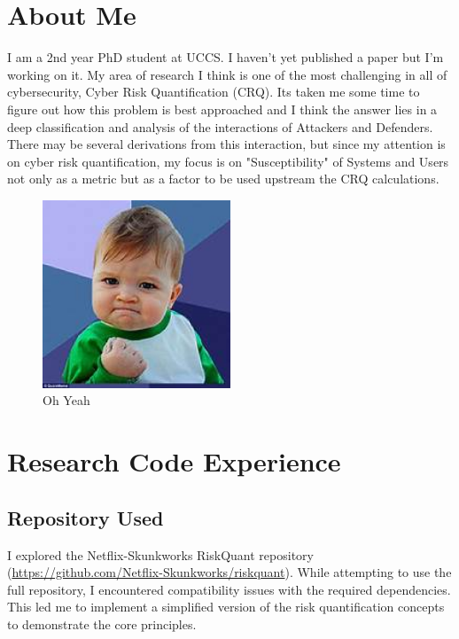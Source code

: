 
% 


\section{About Me}
I am a 2nd year PhD student at UCCS.  I haven't yet published a paper but I'm working on it.  My area of research I think is one of the most challenging in all of cybersecurity, Cyber Risk Quantification (CRQ).  Its taken me some time to figure out how this problem is best approached and I think the answer lies in a deep classification and analysis of the interactions of Attackers and Defenders. There may be several derivations from this interaction, but since my attention is on cyber risk quantification, my focus is on "Susceptibility" of Systems and Users not only as a metric but as a factor to be used upstream the CRQ calculations.
\begin{figure}[h]
    \centering
    \includegraphics[width=0.5\textwidth]{images/Oh_Yeah.jpg}
    \caption{Oh Yeah}
    \label{fig:oh-yeah}
\end{figure}

\section{Research Code Experience}
\subsection{Repository Used}
I explored the Netflix-Skunkworks RiskQuant repository 
(\url{https://github.com/Netflix-Skunkworks/riskquant}). While attempting to use 
the full repository, I encountered compatibility issues with the required dependencies. 
This led me to implement a simplified version of the risk quantification concepts 
to demonstrate the core principles.

